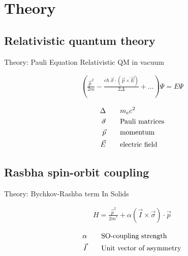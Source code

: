 \documentclass{beamer}
\begin{document}
\section{Theory}
\subsection{Relativistic quantum theory}
\begin{frame}{Theory: Pauli Equation}
    Relativistic QM in vacuum

    \begin{align*}
        \left( \frac{\vec p^2}{2m}- \frac{e\hbar \ \vec\sigma \cdot (\vec p \times \vec E)}
                        {2\Delta} +\ldots\right)\Psi = E \Psi
    \end{align*}

    \begin{align*}
        \Delta\qquad       & m_e c^2\\
        \vec \sigma \qquad & \textnormal{Pauli matrices}\\
        \vec p      \qquad & \textnormal{momentum}\\
        \vec E      \qquad & \textnormal{electric field}\\
    \end{align*}

\end{frame}

\subsection{Rasbha spin-orbit coupling}

\begin{frame}{Theory:  Bychkov-Rashba term}
    In Solids

    \begin{align*}
        H = \frac{\vec p^2}{2 m^*} + \alpha (\vec I \times \vec \sigma) \cdot
        \vec p
    \end{align*}

    \begin{align*}
        \alpha  \qquad & \textnormal{SO-coupling strength}\\
        \vec I  \qquad & \textnormal{Unit vector of asymmetry}
    \end{align*}

\end{frame}
\end{document}
